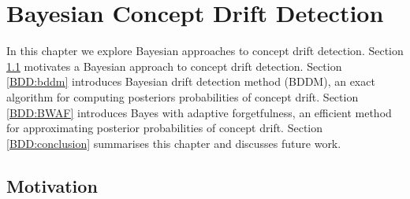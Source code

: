 \chapter{Bayesian Concept Drift Detection} \label{chapt:BDD}

In this chapter we explore Bayesian approaches to concept drift detection. Section \ref{BDD:motivation} motivates a Bayesian approach to concept drift detection. Section \ref{BDD:bddm} introduces Bayesian drift detection method (BDDM), an exact algorithm for computing posteriors probabilities of concept drift. Section \ref{BDD:BWAF} introduces Bayes with adaptive forgetfulness, an efficient method for approximating posterior probabilities of concept drift. Section \ref{BDD:conclusion} summarises this chapter and discusses future work.


\section{Motivation} \label{BDD:motivation}

